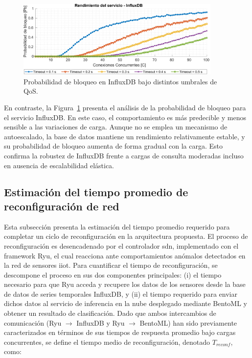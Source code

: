 \begin{figure}[ht!]
    \centering
    \includegraphics[width=0.9\textwidth]{fig/08_datadriven/datadriven_15.pdf}
    \caption{Probabilidad de bloqueo en InfluxDB bajo distintos umbrales de QoS.}
    \label{fig:hey-blocking-test-influx}
\end{figure}

En contraste, la Figura~\ref{fig:hey-blocking-test-influx} presenta el análisis de la probabilidad de bloqueo para el servicio InfluxDB. En este caso, el comportamiento es más predecible y menos sensible a las variaciones de carga. Aunque no se emplea un mecanismo de autoescalado, la base de datos mantiene un rendimiento relativamente estable, y su probabilidad de bloqueo aumenta de forma gradual con la carga. Esto confirma la robustez de InfluxDB frente a cargas de consulta moderadas incluso en ausencia de escalabilidad elástica.


\subsection{Estimación del tiempo promedio de reconfiguración de red}

Esta subsección presenta la estimación del tiempo promedio requerido para completar un ciclo de reconfiguración en la arquitectura propuesta. El proceso de reconfiguración es desencadenado por el controlador \gls{sdn}, implementado con el framework Ryu, el cual reacciona ante comportamientos anómalos detectados en la red de sensores \gls{iiot}. Para cuantificar el tiempo de reconfiguración, se descompone el proceso en sus dos componentes principales: (i) el tiempo necesario para que Ryu acceda y recupere los datos de los sensores desde la base de datos de series temporales InfluxDB, y (ii) el tiempo requerido para enviar dichos datos al servicio de inferencia en la nube desplegado mediante BentoML y obtener un resultado de clasificación. Dado que ambos intercambios de comunicación (Ryu $\rightarrow$ InfluxDB y Ryu $\rightarrow$ BentoML) han sido previamente caracterizados en términos de sus tiempos de respuesta promedio bajo cargas concurrentes, se define el tiempo medio de reconfiguración, denotado $T_{reconf}$, como:

